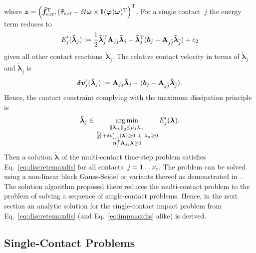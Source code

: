 \documentclass[global,twocolumn]{svjour}
\let\vec\bm
\newcommand{\argmin}{\operatornamewithlimits{arg\,min}}
\newcommand{\compl}{~\bot~}
\newcommand{\vectoscalar}[1]{{\renewcommand{\vec}{}#1}}
\newcommand{\dt}{\ensuremath{\delta t}}
\newcommand{\mat}[1]{{\bf #1}}
\newcommand{\dvect}[2]{\ensuremath{\begin{pmatrix}#1\\#2\end{pmatrix}}}
\newcommand{\transp}{{\mathrm{T}}}
\newcommand{\cross}{\times}
\newcommand{\orient} [1]{\ensuremath{\vec{\varphi}_{#1}}}
\newcommand{\angvel} [1]{\ensuremath{\vec{\omega}_{#1}}}
\newcommand{\inertia}[1]{\ensuremath{\mat{I}_{#1}}}
\newcommand{\forceextapprox} [1]{\ensuremath{\vec{\tilde{f}}_{\ifstrequal{#1}{}{ext}{#1,ext}}}}
\newcommand{\torqueextapprox}[1]{\ensuremath{\vec{\tilde{\tau}}_{\ifstrequal{#1}{}{ext}{#1,ext}}}}
\newcommand{\cof}[1]{\ensuremath{\mu_{#1}}}
\newcommand{\contactforce}[1]{\ensuremath{\vec{\lambda}_{#1}}}
\newcommand{\contactforceCFn}[1]{\ensuremath{\vectoscalar{\contactforce{\ifstrequal{#1}{}{n}{#1,n}}}}}
\newcommand{\contactforceCFto}[1]{\ensuremath{\contactforce{\ifstrequal{#1}{}{to}{#1,to}}}}
\newcommand{\contactforceapprox}[1]{\ensuremath{\vec{\tilde{\lambda}}_{#1}}}
\newcommand{\primerelvel}[1]{\ensuremath{{\vec{\delta v}_{#1}'}}}
\newcommand{\primerelvelCFn}[1]{\ensuremath{\vectoscalar{\primerelvel{\ifstrequal{#1}{}{n}{#1,n}}}}}
\newcommand{\numcontacts}{\ensuremath{\nu_c}}
\newcommand{\twodots}{\ensuremath{\mathrel{\ldotp\ldotp}}}
\begin{document}
			where $\vec z = \left( \forceextapprox{}^\transp, (\torqueextapprox{} - \dt \angvel{} \cross \inertia{}(\orient{}) \angvel{})^\transp \right)^\transp$.
			For a single contact~$j$ the energy term reduces to
			\begin{equation*}
				E_j'(\contactforceapprox{j}) := \frac{1}{2} \contactforceapprox{j}^\transp \mat{A}_{jj} \contactforceapprox{j} - \contactforceapprox{j}^\transp (\vec b_j - \mat{A}_{j\overline{j}} \contactforceapprox{\overline{j}}) + c_2
			\end{equation*}
			given all other contact reactions~$\contactforceapprox{\overline{j}}$. The relative contact velocity in
			terms of $\contactforceapprox{j}$ and $\contactforceapprox{\overline{j}}$ is
			\begin{equation*}
				\primerelvel{j}(\contactforceapprox{j}) := \mat{A}_{jj} \contactforceapprox{j} - (\vec b_j - \mat{A}_{j\overline{j}} \contactforceapprox{\overline{j}}).
			\end{equation*}
			Hence, the contact constraint complying with the maximum dissipation principle is
			\begin{equation}
				\contactforceapprox{j} \in \argmin_{\substack{
						\norm{\contactforceCFto{}}_2 \leq \cof{j} \contactforceCFn{} \\
						\frac{\xi_j}{\dt} + \primerelvelCFn{j}(\contactforce{}) \geq 0 \compl \contactforceCFn{} \geq 0 \\
						\vec n_j^\transp \mat{A}_{jj} \contactforce{} \geq 0
					}} E_j'(\contactforce{}).
				\label{eq:discretemaxdis}
			\end{equation}
			Then a solution $\contactforceapprox{}$ of the multi-contact time-step problem satisfies Eq.~\eqref{eq:discretemaxdis} for all contacts~$j = 1\twodots\numcontacts$.
			The problem can be solved using a non-linear block Gauss-Seidel or variants thereof as demonstrated in~\cite{preclik14,preclik15}.
			The solution algorithm proposed there reduces the multi-contact problem to the problem of solving a sequence of single-contact problems.
			Hence, in the next section an analytic solution for the single-contact impact problem from Eq.~\eqref{eq:discretemaxdis} (and Eq.~\eqref{eq:impmaxdis} alike) is derived.

		\subsection{Single-Contact Problems}
\end{document}
